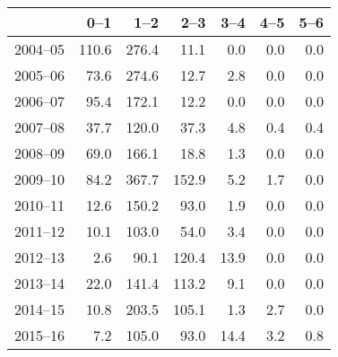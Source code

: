 \begin{table}[ht]
\centering
\begin{tabular}{rrrrrrr}
  \hline
 & 0--1 & 1--2 & 2--3 & 3--4 & 4--5 & 5--6 \\ 
  \hline
2004--05 & 110.6 & 276.4 & 11.1 & 0.0 & 0.0 & 0.0 \\ 
  2005--06 & 73.6 & 274.6 & 12.7 & 2.8 & 0.0 & 0.0 \\ 
  2006--07 & 95.4 & 172.1 & 12.2 & 0.0 & 0.0 & 0.0 \\ 
  2007--08 & 37.7 & 120.0 & 37.3 & 4.8 & 0.4 & 0.4 \\ 
  2008--09 & 69.0 & 166.1 & 18.8 & 1.3 & 0.0 & 0.0 \\ 
  2009--10 & 84.2 & 367.7 & 152.9 & 5.2 & 1.7 & 0.0 \\ 
  2010--11 & 12.6 & 150.2 & 93.0 & 1.9 & 0.0 & 0.0 \\ 
  2011--12 & 10.1 & 103.0 & 54.0 & 3.4 & 0.0 & 0.0 \\ 
  2012--13 & 2.6 & 90.1 & 120.4 & 13.9 & 0.0 & 0.0 \\ 
  2013--14 & 22.0 & 141.4 & 113.2 & 9.1 & 0.0 & 0.0 \\ 
  2014--15 & 10.8 & 203.5 & 105.1 & 1.3 & 2.7 & 0.0 \\ 
  2015--16 & 7.2 & 105.0 & 93.0 & 14.4 & 3.2 & 0.8 \\ 
   \hline
\end{tabular}
\end{table}
